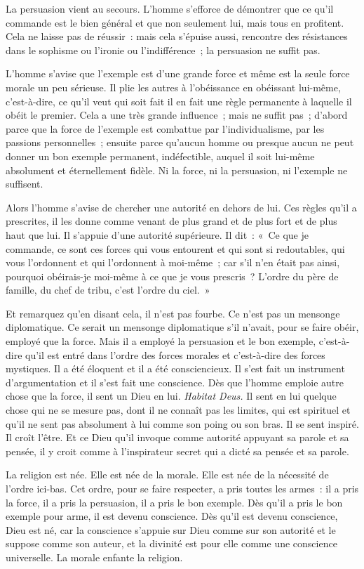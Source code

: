 \documentclass[french,twoside]{book} %
\begin{document}
La persuasion vient au secours. L’homme s’efforce de démontrer que ce qu’il commande est le bien général et que non seulement lui, mais tous en profitent. Cela ne laisse pas de réussir : mais cela s’épuise aussi, rencontre des résistances dans  le sophisme ou l’ironie ou l’indifférence ; la persuasion ne suffit pas.\par
L’homme s’avise que l’exemple est d’une grande force et même est la seule force morale un peu sérieuse. Il plie les autres à l’obéissance en obéissant lui-même, c’est-à-dire, ce qu’il veut qui soit fait il en fait une règle permanente à laquelle il obéit le premier. Cela a une très grande influence ; mais ne suffit pas ; d’abord parce que la force de l’exemple est combattue par l’individualisme, par les passions personnelles ; ensuite parce qu’aucun homme ou presque aucun ne peut donner un bon exemple permanent, indéfectible, auquel il soit lui-même absolument et éternellement fidèle. Ni la force, ni la persuasion, ni l’exemple ne suffisent.\par
Alors l’homme s’avise de chercher une autorité en dehors de lui. Ces règles qu’il a prescrites, il les donne comme venant de plus grand et de plus fort et de plus haut que lui. Il s’appuie d’une autorité supérieure. Il dit : « Ce que je commande, ce sont ces forces qui vous entourent et qui sont si redoutables, qui vous l’ordonnent et qui l’ordonnent à moi-même ; car s’il n’en était pas ainsi, pourquoi obéirais-je moi-même à ce que je vous prescris ? L’ordre du père de famille, du chef de tribu, c’est l’ordre du ciel. »\par
 Et remarquez qu’en disant cela, il n’est pas fourbe. Ce n’est pas un mensonge diplomatique. Ce serait un mensonge diplomatique s’il n’avait, pour se faire obéir, employé que la force. Mais il a employé la persuasion et le bon exemple, c’est-à-dire qu’il est entré dans l’ordre des forces morales et c’est-à-dire des forces mystiques. Il a été éloquent et il a été consciencieux. Il s’est fait un instrument d’argumentation et il s’est fait une conscience. Dès que l’homme emploie autre chose que la force, il sent un Dieu en lui. {\itshape Habitat Deus.} Il sent en lui quelque chose qui ne se mesure pas, dont il ne connaît pas les limites, qui est spirituel et qu’il ne sent pas absolument à lui comme son poing ou son bras. Il se sent inspiré. Il croît l’être. Et ce Dieu qu’il invoque comme autorité appuyant sa parole et sa pensée, il y croit comme à l’inspirateur secret qui a dicté sa pensée et sa parole.\par
La religion est née. Elle est née de la morale. Elle est née de la nécessité de l’ordre ici-bas. Cet ordre, pour se faire respecter, a pris toutes les armes : il a pris la force, il a pris la persuasion, il a pris le bon exemple. Dès qu’il a pris le bon exemple pour arme, il est devenu conscience. Dès qu’il est devenu conscience, Dieu est né, car la conscience s’appuie sur Dieu comme sur son autorité et le suppose comme son auteur, et la divinité  est pour elle comme une conscience universelle. La morale enfante la religion.\par
\end{document}
